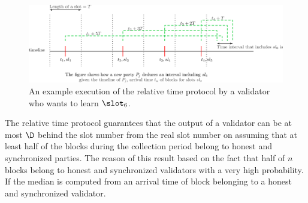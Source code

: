 \begin{figure}[h]
	\centering
	\includegraphics[width=1.\textwidth]{images/relative.png}
	\caption{An example execution of the relative time protocol by a validator who wants to learn $ \slot_{6} $.}
	\label{fig:relativetime}
\end{figure}



The relative time protocol guarantees that the output of a validator can be at most $ \D $ behind the slot number from the real slot number on assuming that at least half of the blocks during the collection period belong to honest and synchronized parties. The reason of this result based on the fact that half of $ n $ blocks belong to honest and synchronized validators with a very high probability. If the median is computed from an arrival time of block belonging to a honest and synchronized validator.